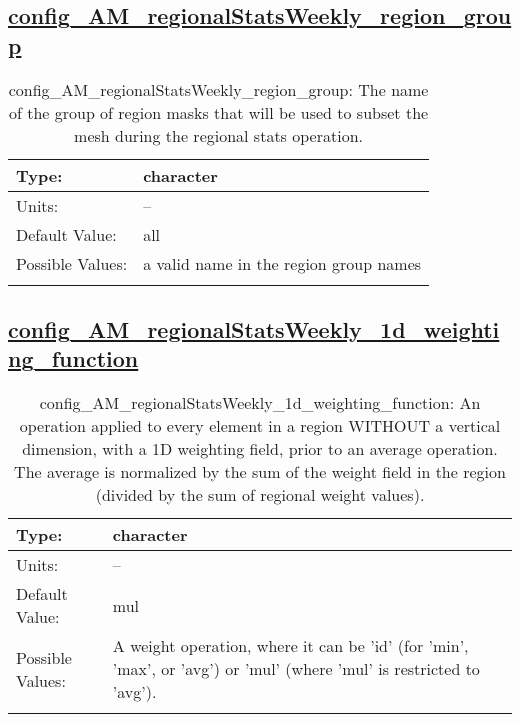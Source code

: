 \subsection[config\_AM\_regionalStatsWeekly\_region\_group]{\hyperref[sec:nm_tab_AM_regionalStatsWeekly]{config\_AM\_regionalStatsWeekly\_region\_group}}
\label{subsec:nm_sec_config_AM_regionalStatsWeekly_region_group}
\begin{center}
\begin{longtable}{| p{2.0in} || p{4.0in} |}
    \hline
    Type: & character \\
    \hline
    Units: & -- \\
    \hline
    Default Value: & all \\
    \hline
    Possible Values: & a valid name in the region group names \\
    \hline
    \caption{config\_AM\_regionalStatsWeekly\_region\_group: The name of the group of region masks that will be used to subset the mesh during the regional stats operation.}
\end{longtable}
\end{center}
\subsection[config\_AM\_regionalStatsWeekly\_1d\_weighting\_function]{\hyperref[sec:nm_tab_AM_regionalStatsWeekly]{config\_AM\_regionalStatsWeekly\_1d\_weighting\_function}}
\label{subsec:nm_sec_config_AM_regionalStatsWeekly_1d_weighting_function}
\begin{center}
\begin{longtable}{| p{2.0in} || p{4.0in} |}
    \hline
    Type: & character \\
    \hline
    Units: & -- \\
    \hline
    Default Value: & mul \\
    \hline
    Possible Values: & A weight operation, where it can be 'id' (for 'min', 'max', or 'avg') or 'mul' (where 'mul' is restricted to 'avg'). \\
    \hline
    \caption{config\_AM\_regionalStatsWeekly\_1d\_weighting\_function: An operation applied to every element in a region WITHOUT a vertical dimension, with a 1D weighting field, prior to an average operation. The average is normalized by the sum of the weight field in the region (divided by the sum of regional weight values).}
\end{longtable}
\end{center}
